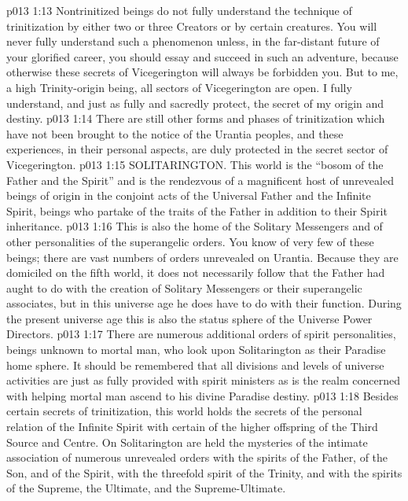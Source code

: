 \vs p013 1:13 Nontrinitized beings do not fully understand the technique of trinitization by either two or three Creators or by certain creatures. You will never fully understand such a phenomenon unless, in the far\hyp{}distant future of your glorified career, you should essay and succeed in such an adventure, because otherwise these secrets of Vicegerington will always be forbidden you. But to me, a high Trinity\hyp{}origin being, all sectors of Vicegerington are open. I fully understand, and just as fully and sacredly protect, the secret of my origin and destiny.
\vs p013 1:14 There are still other forms and phases of trinitization which have not been brought to the notice of the Urantia peoples, and these experiences, in their personal aspects, are duly protected in the secret sector of Vicegerington.
\vs p013 1:15 \bibnobreakspace SOLITARINGTON. This world is the “bosom of the Father and the Spirit” and is the rendezvous of a magnificent host of unrevealed beings of origin in the conjoint acts of the Universal Father and the Infinite Spirit, beings who partake of the traits of the Father in addition to their Spirit inheritance.
\vs p013 1:16 This is also the home of the Solitary Messengers and of other personalities of the superangelic orders. You know of very few of these beings; there are vast numbers of orders unrevealed on Urantia. Because they are domiciled on the fifth world, it does not necessarily follow that the Father had aught to do with the creation of Solitary Messengers or their superangelic associates, but in this universe age he does have to do with their function. During the present universe age this is also the status sphere of the Universe Power Directors.
\vs p013 1:17 There are numerous additional orders of spirit personalities, beings unknown to mortal man, who look upon Solitarington as their Paradise home sphere. It should be remembered that all divisions and levels of universe activities are just as fully provided with spirit ministers as is the realm concerned with helping mortal man ascend to his divine Paradise destiny.
\vs p013 1:18 \pc {} Besides certain secrets of trinitization, this world holds the secrets of the personal relation of the Infinite Spirit with certain of the higher offspring of the Third Source and Centre. On Solitarington are held the mysteries of the intimate association of numerous unrevealed orders with the spirits of the Father, of the Son, and of the Spirit, with the threefold spirit of the Trinity, and with the spirits of the Supreme, the Ultimate, and the Supreme\hyp{}Ultimate.
